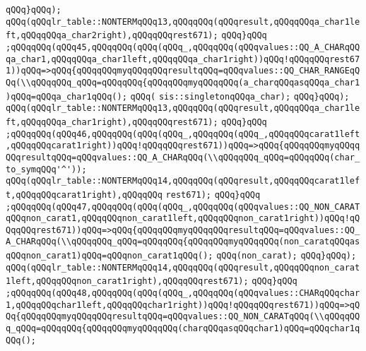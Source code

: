 \verb|qQQq}qQQq);|\newline
\verb|qQQq(qQQqlr_table::NONTERMqQQq13,qQQqqQQq(qQQqresult,qQQqqQQqa_char1left,qQQqqQQqa_char2right),qQQqqQQqrest671);|\newline
\verb|qQQq}qQQq|\newline
\verb|;qQQqqQQq(qQQq45,qQQqqQQq(qQQq(qQQq_,qQQqqQQq(qQQqvalues::QQ_A_CHARqQQqa_char1,qQQqqQQqa_char1left,qQQqqQQqa_char1right))qQQq!qQQqqQQqrest671))qQQq=>qQQq{qQQqqQQqmyqQQqqQQqresultqQQq=qQQqvalues::QQ_CHAR_RANGEqQQq(\\qQQqqQQq_qQQq=qQQqqQQq{qQQqqQQqmyqQQqqQQq(a_charqQQqasqQQqa_char1)qQQq=qQQqa_char1qQQq();|\newline
\verb|qQQq(|\newline
\verb|sis::singletonqQQqa_char);|\newline
\verb|qQQq}qQQq);|\newline
\verb|qQQq(qQQqlr_table::NONTERMqQQq13,qQQqqQQq(qQQqresult,qQQqqQQqa_char1left,qQQqqQQqa_char1right),qQQqqQQqrest671);|\newline
\verb|qQQq}qQQq|\newline
\verb|;qQQqqQQq(qQQq46,qQQqqQQq(qQQq(qQQq_,qQQqqQQq(qQQq_,qQQqqQQqcarat1left,qQQqqQQqcarat1right))qQQq!qQQqqQQqrest671))qQQq=>qQQq{qQQqqQQqmyqQQqqQQqresultqQQq=qQQqvalues::QQ_A_CHARqQQq(\\qQQqqQQq_qQQq=qQQqqQQq(char_to_symqQQq'^'));|\newline
\verb|qQQq(qQQqlr_table::NONTERMqQQq14,qQQqqQQq(qQQqresult,qQQqqQQqcarat1left,qQQqqQQqcarat1right),qQQqqQQq|\newline
\verb|rest671);|\newline
\verb|qQQq}qQQq|\newline
\verb|;qQQqqQQq(qQQq47,qQQqqQQq(qQQq(qQQq_,qQQqqQQq(qQQqvalues::QQ_NON_CARATqQQqnon_carat1,qQQqqQQqnon_carat1left,qQQqqQQqnon_carat1right))qQQq!qQQqqQQqrest671))qQQq=>qQQq{qQQqqQQqmyqQQqqQQqresultqQQq=qQQqvalues::QQ_A_CHARqQQq(\\qQQqqQQq_qQQq=qQQqqQQq{qQQqqQQqmyqQQqqQQq(non_caratqQQqasqQQqnon_carat1)qQQq=qQQqnon_carat1qQQq();|\newline
\newline
\verb|qQQq(non_carat);|\newline
\verb|qQQq}qQQq);|\newline
\verb|qQQq(qQQqlr_table::NONTERMqQQq14,qQQqqQQq(qQQqresult,qQQqqQQqnon_carat1left,qQQqqQQqnon_carat1right),qQQqqQQqrest671);|\newline
\verb|qQQq}qQQq|\newline
\verb|;qQQqqQQq(qQQq48,qQQqqQQq(qQQq(qQQq_,qQQqqQQq(qQQqvalues::CHARqQQqchar1,qQQqqQQqchar1left,qQQqqQQqchar1right))qQQq!qQQqqQQqrest671))qQQq=>qQQq{qQQqqQQqmyqQQqqQQqresultqQQq=qQQqvalues::QQ_NON_CARATqQQq(\\qQQqqQQq_qQQq=qQQqqQQq{qQQqqQQqmyqQQqqQQq(charqQQqasqQQqchar1)qQQq=qQQqchar1qQQq();|\newline
